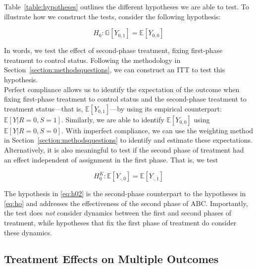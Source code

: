 \noindent Table~\ref{table:hypotheses} outlines the different hypotheses we are able to test. To illustrate how we construct the tests, consider the following hypothesis: 

\begin{equation}
H_{0}: \mathbb{G} \left[ Y_{0,1} \right]  = \mathbb{E} \left[ Y_{0,0} \right]  \label{eq:h0fixfirst}
\end{equation}

\noindent In words, we test the effect of second-phase treatment, fixing first-phase treatment to control status. Following the methodology in Section~\ref{section:methodsquestions}, we can construct an ITT to test this hypothesis.\\

\noindent Perfect compliance allows us to identify the expectation of the outcome when fixing first-phase treatment to control status and the second-phase treatment to treatment status---that is, $\mathbb{E} \left[ Y_{0,1} \right]$---by using its empirical counterpart: $\mathbb{E} \left[ Y | R = 0, S = 1 \right]$. Similarly, we are able to identify $\mathbb{E} \left[ Y_{0,0} \right]$ using $\mathbb{E} \left[ Y | R = 0, S = 0 \right]$. With imperfect compliance, we can use the weighting method in Section~\ref{section:methodsquestions} to identify and estimate these expectations.\\

\noindent Alternatively, it is also meaningful to test if the second phase of treatment had an effect independent of assignment in the first phase. That is, we test

\begin{equation}
H_{0}^K: \mathbb{E} \left[ Y_{\cdot,0} \right] = \mathbb{E} \left[ Y_{\cdot,1} \right] \label{eq:h02}
\end{equation}

\noindent The hypothesis in \eqref{eq:h02} is the second-phase counterpart to the hypotheses in \eqref{eq:ho} and addresses the effectiveness of the second phase of ABC. Importantly, the test does \emph{not} consider dynamics between the first and second phases of treatment, while hypotheses that fix the first phase of treatment do consider these dynamics.\\

\subsection{Treatment Effects on Multiple Outcomes} \label{section:counts}

